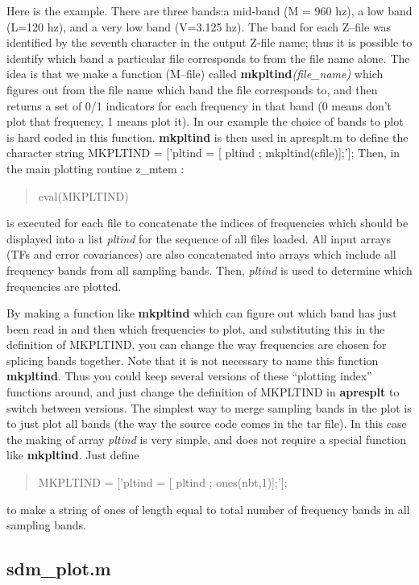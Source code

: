 \begin{itemize}
Here is the example.
There are three bands:a mid-band (M = 960 hz),
a low band (L=120 hz), and a very low band (V=3.125 hz).
The band for each Z--file was identified by the seventh character
in the output Z-file name; thus it is possible to identify
which band a particular file corresponds to from the file name alone.
The idea is that we make a function (M--file)
called {\bf mkpltind}{\it (file\_name)} which figures out from the file name
which band the file corresponds to,
and then returns a set of 0/1 indicators for each frequency in that band
(0 means don't plot that frequency, 1 means plot it).
In our example the choice of bands to plot is hard coded in this function.
{\bf mkpltind} is then used in apresplt.m to define the
character string  MKPLTIND = ['pltind = [ pltind ; mkpltind(cfile)];'];
Then, in the main plotting routine z\_mtem  :
\begin{quote}
eval(MKPLTIND)
\end{quote}
is executed for each file to concatenate the indices of frequencies 
which should be displayed into a list {\it pltind}
for the sequence of all files loaded.
All input arrays (TFs and error covariances) are also concatenated
into arrays which include all frequency bands from all sampling bands.
Then, {\it pltind} is used to determine which frequencies are plotted.

By making a function like {\bf mkpltind} which can figure out
which band has just been read in and then which frequencies to plot,
and substituting this in the definition of MKPLTIND, you can change
the way frequencies are chosen for splicing bands together.
Note that it is not necessary to name this function {\bf mkpltind}.
Thus you could keep several versions of these ``plotting index''
functions around, and just change the definition of MKPLTIND 
in {\bf apresplt} to switch between versions.
The simplest way to merge sampling bands in the plot
is to just plot all bands
(the way the source code comes in the tar file).
In this case the making of
array {\it pltind} is very simple, and does not require a special
function like {\bf mkpltind}.  Just define 
\begin{quote}
MKPLTIND = ['pltind = [ pltind ; ones(nbt,1)];'];
\end{quote}
to make a string of ones of length equal to total number of
frequency bands in all sampling bands. 
\end{itemize}

\subsection{sdm\_plot.m}

